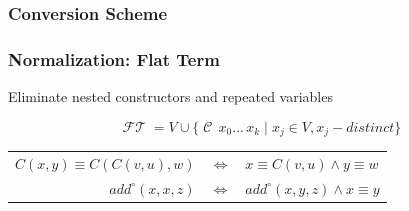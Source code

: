 \documentclass[xcolor=table, aspectratio=169]{beamer}
\DeclareMathOperator{\FlatTerm}{\mathcal{FT}}
\DeclareMathOperator{\Cons}{\mathcal{C}}
\begin{document}
\lstset{basicstyle=\small}

%     
%     

\begin{frame}[fragile]
  \frametitle{Conversion Scheme}
  \begin{center}
    

  \end{center}
\end{frame}


\begin{frame}[fragile]
  \frametitle{Normalization: Flat Term}
\begin{center}

Eliminate nested constructors and repeated variables

\end{center}

  \[  \FlatTerm = V \cup \{\Cons \, x_0 \ldots \, x_{k} \mid x_{j}\in V, x_j - distinct \} \]

\vfill

\begin{center}
\begin{tabular}{rcl}
 $C\left( x, y \right) \equiv C\left( C\left( v, u \right), w \right)$ & $\iff$ &  $x \equiv C\left(v, u \right) \land y \equiv w$ \\
 $add^{\circ}(x, x, z)$ & $\iff$ & $add^{\circ}\left( x, y, z \right) \land x \equiv y$
\end{tabular}
\end{center}

\end{frame}
\end{document}
